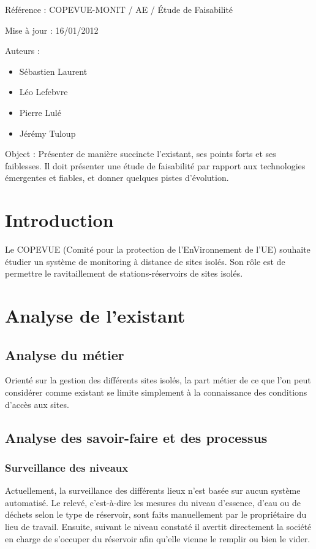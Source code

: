 \documentclass{article}
\begin{document}
Référence : COPEVUE-MONIT / AE / Étude de Faisabilité

Mise à jour : 16/01/2012

Auteurs : 

\begin{itemize}
\item Sébastien Laurent
\item Léo Lefebvre
\item Pierre Lulé
\item Jérémy Tuloup
\end{itemize}

Object : Présenter de manière succincte l’existant, ses points forts et
ses faiblesses. Il doit présenter une étude de faisabilité par rapport
aux technologies émergentes et fiables, et donner quelques pistes
d’évolution.
\newpage
\tableofcontents
\section{Introduction}
Le COPEVUE (Comité pour la protection de l’EnVironnement de l’UE)
souhaite étudier un système de monitoring à distance de sites isolés.
Son rôle est de permettre le ravitaillement de stations-réservoirs de
sites isolés.

\section{Analyse de l’existant}
\subsection{Analyse du métier}
Orienté sur la gestion des différents sites isolés, la part métier de ce
que l’on peut considérer comme existant se limite simplement à la
connaissance des conditions d’accès aux sites.

\subsection{Analyse des savoir-faire et des processus}
\subsubsection{Surveillance des niveaux}
Actuellement, la surveillance des différents lieux n’est basée sur aucun
système automatisé. Le relevé, c’est-à-dire les mesures du niveau
d’essence, d’eau ou de déchets selon le type de réservoir, sont faits
manuellement par le propriétaire du lieu de travail. Ensuite, suivant
le niveau constaté il avertit directement la société en charge de
s’occuper du réservoir afin qu’elle vienne le remplir ou bien le vider.
\end{document}
